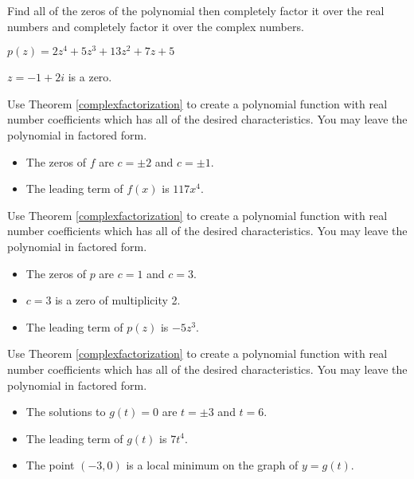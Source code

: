 \documentclass{ximera}
\begin{document}
\begin{problem}\label{compfactpolylast}
Find all of the zeros of the polynomial then completely factor it over the real numbers and completely factor it over the complex numbers.

$p(z) = 2z^4+5z^3+13z^2+7z+5$ 

\begin{hint}
$z = -1+2i$ is a zero.  
\end{hint}
\end{problem} 

\begin{problem}\label{buildcomppolyfirst}
Use Theorem \ref{complexfactorization} to create a polynomial function with real number coefficients which has all of the desired characteristics.  You may leave the polynomial in factored form.

\begin{itemize}

\item The zeros of $f$ are $c = \pm 2$ and $c = \pm 1$.
\item The leading term of $f(x)$ is $117x^4$.

\end{itemize}
\end{problem}

\begin{problem}
Use Theorem \ref{complexfactorization} to create a polynomial function with real number coefficients which has all of the desired characteristics.  You may leave the polynomial in factored form.

\begin{itemize}

\item The zeros of $p$ are $c=1$ and $c = 3$.
\item $c=3$ is a zero of multiplicity 2.
\item The leading term of $p(z)$ is $-5z^3$.

\end{itemize}
\end{problem}

\begin{problem}
Use Theorem \ref{complexfactorization} to create a polynomial function with real number coefficients which has all of the desired characteristics.  You may leave the polynomial in factored form.

\begin{itemize}

\item The solutions to $g(t) = 0$ are $t = \pm 3$ and $t=6$.
\item The leading term of $g(t)$ is $7t^4$.
\item The point $(-3,0)$ is a local minimum on the graph of $y=g(t)$.

\end{itemize}
\end{problem}
\end{document}
